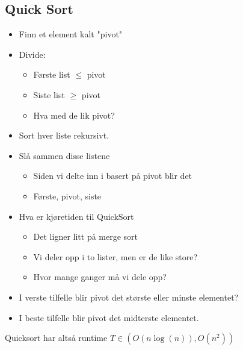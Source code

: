 \documentclass{article}
\begin{document}
\subsection{Quick Sort}

\begin{itemize}
    \item Finn et element kalt "pivot"
    \item Divide:
        \begin{itemize}
            \item Første list \( \leq \) pivot
            \item Siste list \( \geq \) pivot
            \item Hva med de lik pivot?
        \end{itemize}
    \item Sort hver liste rekursivt.
    \item Slå sammen disse listene
        \begin{itemize}
            \item Siden vi delte inn i basert på pivot blir det
            \item Første, pivot, siste
        \end{itemize}
\end{itemize}

\begin{itemize}
    \item Hva er kjøretiden til QuickSort
    \begin{itemize}
        \item Det ligner litt på merge sort
        \item Vi deler opp i to lister, men er de like store?
        \item Hvor mange ganger må vi dele opp?
    \end{itemize}
\item I verste tilfelle blir pivot det største eller minste elementet?
\item I beste tilfelle blir pivot det midterste elementet.

\end{itemize}

Quicksort har altså runtime \( T \in (O\left( n \log\left( n \right) \right), O\left( n^2 \right))\)
\end{document}
